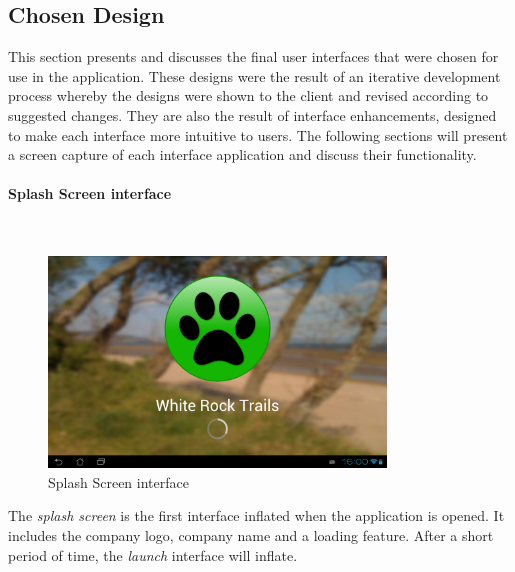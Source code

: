 \documentclass[11pt,a4paper]{report}
\begin{document}
\subsection{Chosen Design}
\label{sec:chosen-designs}

This section presents and discusses the final user interfaces that were chosen for use in the application. These designs were the result of an iterative development process whereby the designs were shown to the client and revised according to suggested changes. They are also the result of interface enhancements, designed to make each interface more intuitive to users. The following sections will present a screen capture of each interface application and discuss their functionality.

\paragraph*{Splash Screen interface}\mbox{}\\ 

\begin{figure}[H]
    \centering
    \includegraphics[width=0.8\textwidth]{chris/splash_screen}
    \caption{Splash Screen interface}
    \label{fig:splash_screen}
\end{figure}

The \emph{splash screen} is the first interface inflated when the application is opened. It includes the company logo, company name and a loading feature. After a short period of time, the \emph{launch} interface will inflate.
\end{document}
